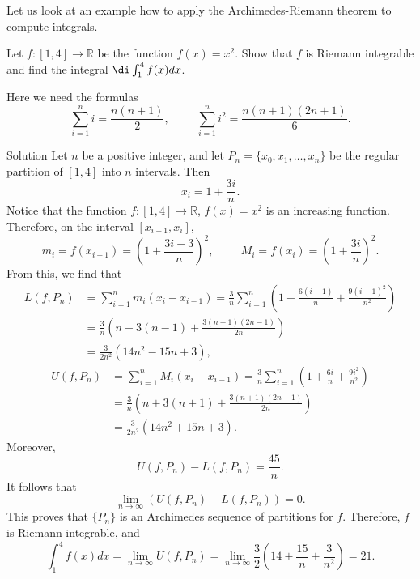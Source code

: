Let us look at an example how to apply the Archimedes-Riemann theorem to compute integrals.
\begin{example}[label=ex230221_4]{}
Let $f:[1, 4]\to\mathbb{R}$ be the function $f(x)=x^2 $. Show that $f$ is Riemann integrable and find the integral $\di \int_1^4f(x)dx$.
\end{example}
Here we need the formulas
\[\sum_{i=1}^ni=\frac{n(n+1)}{2},\hspace{1cm}\sum_{i=1}^ni^2=\frac{n(n+1)(2n+1)}{6}.\]
\begin{solution}{Solution}
 Let $n$ be a positive integer, and let $P_n=\{x_0, x_1, \ldots, x_n\}$ be the regular partition of $[1,4]$ into $n$  intervals. Then
\[x_i=1+\frac{3i}{n}.\]
Notice that  the function $f:[1, 4]\to\mathbb{R}$, $f(x)=x^2 $ is an increasing function. Therefore, on the interval $[x_{i-1}, x_i]$, 
\[m_i=f(x_{i-1})=\left(1+\frac{3i-3}{n}\right)^2,\hspace{1cm}M_i=f(x_i)=\left(1+\frac{3i}{n}\right)^2.\]
From this, we find that
\begin{align*}
L(f,P_n)&=\sum_{i=1}^nm_i(x_i-x_{i-1})=\frac{3}{n}\sum_{i=1}^n\left(1+\frac{6(i-1)}{n}+\frac{9(i-1)^2}{n^2}\right)\\
&=\frac{3}{n}\left(n+3(n-1)+\frac{3(n-1)(2n-1)}{2n}\right)\\
&=\frac{3}{2n^2}(14n^2-15n+3),
\end{align*}\bs
\begin{align*}
U(f,P_n)&=\sum_{i=1}^nM_i(x_i-x_{i-1})=\frac{3}{n}\sum_{i=1}^n\left(1+\frac{6i}{n}+\frac{9i^2}{n^2}\right)\\
&=\frac{3}{n}\left(n+3(n+1)+\frac{3(n+1)(2n+1)}{2n}\right)\\
&=\frac{3}{2n^2}(14n^2+15n+3).
\end{align*}Moreover,
\[U(f,P_n)-L(f,P_n)=\frac{45}{n}.\]
It follows that
\[\lim_{n\to\infty}\left(U(f,P_n)-L(f,P_n)\right)=0.\]This proves that $\{P_n\}$ is an Archimedes sequence of partitions for $f$. Therefore, $f$ is Riemann integrable, and
\[\int_1^4f(x)dx=\lim_{n\to\infty}U(f,P_n)=\lim_{n\to\infty} \frac{3}{2 }\left(14 +\frac{15}{n}+\frac{3}{n^2}\right)=21.\]
\end{solution}

